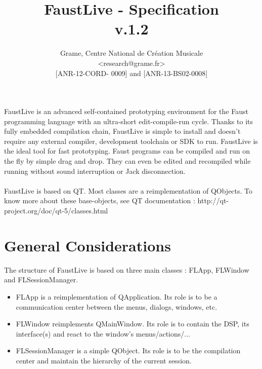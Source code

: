 \documentclass[a4paper]{article}
\begin{document}
\title{FaustLive - Specification \\ v.1.2}

\author{Grame, Centre National de Création Musicale\\
{\small <research@grame.fr>} \\
\vspace{2mm}
[ANR-12-CORD- 0009] and [ANR-13-BS02-0008]
}

\maketitle


\vspace{\fill}

FaustLive is an advanced self-contained prototyping environment for the Faust programming language with an ultra-short edit-compile-run cycle. Thanks to its fully embedded compilation chain, FaustLive is simple to install and doesn't require any external compiler, development toolchain or SDK to run. FaustLive is the ideal tool for fast prototyping. Faust programs can be compiled and run on the fly by simple drag and drop. They can even be edited and recompiled while running without sound interruption or Jack disconnection. \\
\\
FaustLive is based on QT. Most classes are a reimplementation of QObjects. 
To know more about these base-objects, see QT documentation : http://qt-project.org/doc/qt-5/classes.html
\vspace{\fill}

\newpage
\tableofcontents

\newpage
\section{General Considerations}

The structure of FaustLive is based on three main classes : FLApp, FLWindow and FLSessionManager.

\begin{itemize}
\item FLApp is a reimplementation of QApplication. Its role is to be a communication center between the menus, dialogs, windows, etc. 

\item FLWindow reimplements QMainWindow. Its role is to contain the DSP, its interface(s) and react to the window's menus/actions/...

\item FLSessionManager is a simple QObject. Its role is to be the compilation center and maintain the hierarchy of the current session. 

\end{itemize}
\end{document}
